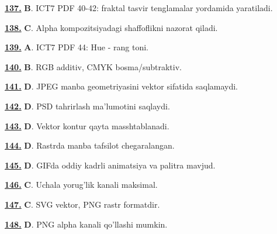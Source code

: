 \documentclass[10pt,a4paper,oneside]{article}
\begin{document}
\par\vspace{3mm}
\noindent\hyperlink{q137}{\textbf{137.}} \textbf{B}.  ICT7 PDF 40-42: fraktal tasvir tenglamalar yordamida yaratiladi.
\par\vspace{3mm}
\noindent\hyperlink{q138}{\textbf{138.}} \textbf{C}.  Alpha kompozitsiyadagi shaffoflikni nazorat qiladi.
\par\vspace{3mm}
\noindent\hyperlink{q139}{\textbf{139.}} \textbf{A}.  ICT7 PDF 44: Hue - rang toni.
\par\vspace{3mm}
\noindent\hyperlink{q140}{\textbf{140.}} \textbf{B}.  RGB additiv, CMYK bosma/subtraktiv.
\par\vspace{3mm}
\noindent\hyperlink{q141}{\textbf{141.}} \textbf{D}.  JPEG manba geometriyasini vektor sifatida saqlamaydi.
\par\vspace{3mm}
\noindent\hyperlink{q142}{\textbf{142.}} \textbf{D}.  PSD tahrirlash ma'lumotini saqlaydi.
\par\vspace{3mm}
\noindent\hyperlink{q143}{\textbf{143.}} \textbf{D}.  Vektor kontur qayta masshtablanadi.
\par\vspace{3mm}
\noindent\hyperlink{q144}{\textbf{144.}} \textbf{D}.  Rastrda manba tafsilot chegaralangan.
\par\vspace{3mm}
\noindent\hyperlink{q145}{\textbf{145.}} \textbf{D}.  GIFda oddiy kadrli animatsiya va palitra mavjud.
\par\vspace{3mm}
\noindent\hyperlink{q146}{\textbf{146.}} \textbf{C}.  Uchala yorug'lik kanali maksimal.
\par\vspace{3mm}
\noindent\hyperlink{q147}{\textbf{147.}} \textbf{C}.  SVG vektor, PNG rastr formatdir.
\par\vspace{3mm}
\noindent\hyperlink{q148}{\textbf{148.}} \textbf{D}.  PNG alpha kanali qo'llashi mumkin.
\end{document}
